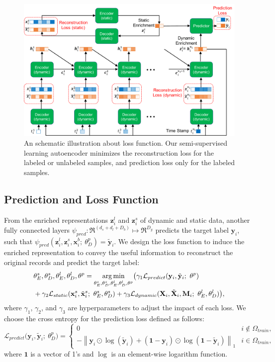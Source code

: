 \begin{figure}
    \includegraphics[width=\textwidth]{images/objective.pdf}
    \caption{An schematic illustration about loss function. Our semi-supervised learning autoencoder minimizes the reconstruction loss for the labeled or unlabeled samples, and prediction loss only for the labeled samples.} \label{fig: objective}
\end{figure}
\subsection{Prediction and Loss Function}
From the enriched representations $\mathbf{z}_i^l$ and $\mathbf{z}_i^s$ of dynamic and static data, another fully connected layers $\psi_{pred}: \Re^{(d_s + d_l + D_b)}  \mapsto \Re^{D_y}$ predicts the target label $\mathbf{y}_i$, such that $\psi_{pred}(\mathbf{z}_i^l, \mathbf{z}_i^s, \mathbf{x}_i^b;\ \theta_{D}^p) = \tilde{\mathbf{y}}_i$.
We design the loss function to induce the enriched representation to convey the useful information to reconstruct the original records and predict the target label:
\begin{equation}\label{eq: total loss}
\begin{aligned}
    &\theta_{E}^s, \theta_{D}^s, \theta^l_{E}, \theta^l_{D}, \theta^p = \argmin_{\theta_{E}^s, \theta_{D}^s, \theta^l_{E}, \theta^l_{D}, \theta^p} \bigl(\gamma_1 \mathcal{L}_{predict}(\mathbf{y}_i, \tilde{\mathbf{y}}_i;\ \theta^p) \\
    & + \gamma_2 \mathcal{L}_{static}(\mathbf{x}_i^s, \tilde{\mathbf{x}}_i^s;\ \theta_{E}^s, \theta_{D}^s) + \gamma_3 \mathcal{L}_{dynamic}(\mathbf{X}_i, \tilde{\mathbf{X}}_i, \mathbf{M}_i;\ \theta^l_{E}, \theta^l_{D})\bigr),
\end{aligned}
\end{equation}
where $\gamma_1$, $\gamma_2$, and $\gamma_3$ are hyperparameters to adjust the impact of each loss. 
We choose the cross entropy for the prediction loss defined as follows:
\[
\mathcal{L}_{predict}\bigl(\mathbf{y}_i, \tilde{\mathbf{y}}_i;\ \theta_{D}^p\bigr)=
\begin{cases}
0 & i \notin \Omega_{train},\\
- \left\|\mathbf{y}_i \odot \operatorname{log}(\tilde{\mathbf{y}}_i) + (\mathbf{1} - \mathbf{y}_i) \odot \operatorname{log}(\mathbf{1} - \tilde{\mathbf{y}}_i)\right\|_1 & i \in \Omega_{train},
\end{cases}
\]
where $\mathbf{1}$ is a vector of 1's and $\operatorname{log}$ is an element-wise logarithm function. 
